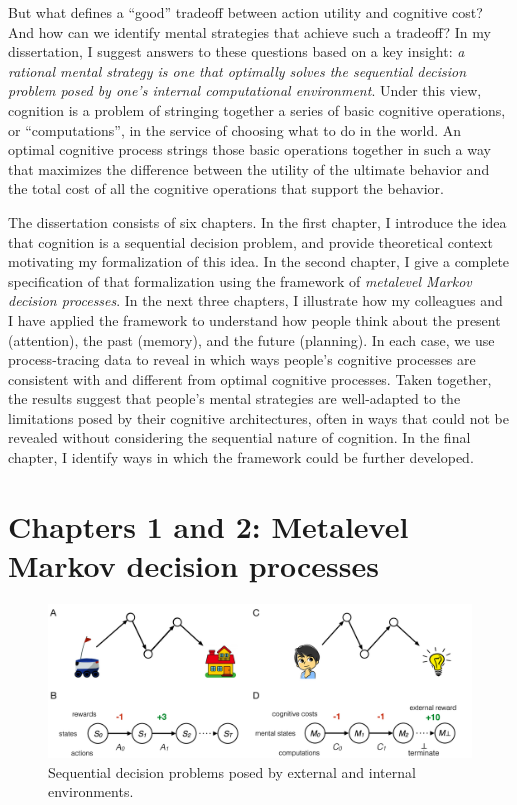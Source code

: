 \documentclass[dsingle]{memo}
\begin{document}
But what defines a ``good'' tradeoff between action utility and cognitive cost? And how can we identify mental strategies that achieve such a tradeoff? In my dissertation, I suggest answers to these questions based on a key insight: \emph{a rational mental strategy is one that optimally solves the sequential decision problem posed by one's internal computational environment}. Under this view, cognition is a problem of stringing together a series of basic cognitive operations, or ``computations'', in the service of choosing what to do in the world. An optimal cognitive process strings those basic operations together in such a way that maximizes the difference between the utility of the ultimate behavior and the total cost of all the cognitive operations that support the behavior.

The dissertation consists of six chapters. In the first chapter, I introduce the idea that cognition is a sequential decision problem, and provide theoretical context motivating my formalization of this idea. In the second chapter, I give a complete specification of that formalization using the framework of \emph{metalevel Markov decision processes}. In the next three chapters, I illustrate how my colleagues and I have applied the framework to understand how people think about the present (attention), the past (memory), and the future (planning). In each case, we use process-tracing data to reveal in which ways people's cognitive processes are consistent with and different from optimal cognitive processes. Taken together, the results suggest that people's mental strategies are well-adapted to the limitations posed by their cognitive architectures, often in ways that could not be revealed without considering the sequential nature of cognition. In the final chapter, I identify ways in which the framework could be further developed.


\section{Chapters 1 and 2: Metalevel Markov decision processes}\label{formal-framework-metalevel-mdps}


\begin{figure}[tbp]
  \centering
  \includegraphics[width=\textwidth]{diagrams/precis/intro.pdf}
  \caption{Sequential decision problems posed by external and internal environments.}
  \label{fig:sequential-intuition}
\end{figure}
\end{document}
